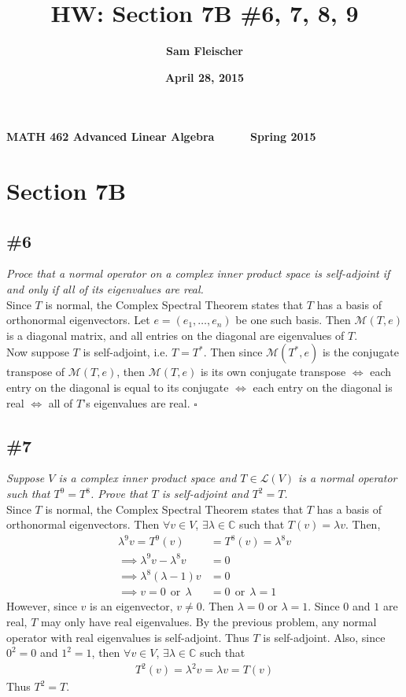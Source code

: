 \documentclass[12pt]{article}
\title{\bf HW: Section 7B \#6, 7, 8, 9}
\author{\bf Sam Fleischer}
\date{\bf April 28, 2015}
\begin{document}
{\bf MATH 462 \hfill Advanced Linear Algebra \ \ \ \ \ \hfill Spring 2015} 

{\let\newpage\relax\maketitle}

\section*{Section 7B}
\subsection*{\#6}
{\it Proce that a normal operator on a complex inner product space is self-adjoint if and only if all of its eigenvalues are real.} \\

\noindent Since $T$ is normal, the Complex Spectral Theorem states that $T$ has a basis of orthonormal eigenvectors.  Let $e = (e_1, \dots, e_n)$ be one such basis.  Then $\mathcal{M}(T, e)$ is a diagonal matrix, and all entries on the diagonal are eigenvalues of $T$. \\

\noindent Now suppose $T$ is self-adjoint, i.e. $T = T^*$.  Then since $\mathcal{M}(T^*, e)$ is the conjugate transpose of $\mathcal{M}(T, e)$, then $\mathcal{M}(T, e)$ is its own conjugate transpose $\iff$ each entry on the diagonal is equal to its conjugate $\iff$ each entry on the diagonal is real $\iff$ all of $T$'s eigenvalues are real. \hfill $\square$

\subsection*{\#7}
{\it Suppose $V$ is a complex inner product space and $T \in \mathcal{L}(V)$ is a normal operator such that $T^9 = T^8$.  Prove that $T$ is self-adjoint and $T^2 = T$.} \\

\noindent Since $T$ is normal, the Complex Spectral Theorem states that $T$ has a basis of orthonormal eigenvectors.  Then $\forall v \in V$, $\exists \lambda \in \mathbb{C}$ such that $T(v) = \lambda v$.  Then,
\begin{align*}
		\lambda^9v = T^9(v) &= T^8(v) = \lambda^8v \\
		\implies \lambda^9v - \lambda^8v &= 0 \\
		\implies \lambda^8(\lambda - 1)v &= 0 \\
		\implies v = 0\ \ \text{or}\ \ \lambda &= 0\ \ \text{or}\ \ \lambda = 1
\end{align*}
However, since $v$ is an eigenvector, $v \neq 0$.  Then $\lambda = 0$ or $\lambda = 1$.  Since $0$ and $1$ are real, $T$ may only have real eigenvalues.  By the previous problem, any normal operator with real eigenvalues is self-adjoint.  Thus $T$ is self-adjoint.  Also, since $0^2 = 0$ and $1^2 = 1$, then $\forall v \in V$, $\exists \lambda \in \mathbb{C}$ such that
\begin{align*}
		T^2(v) = \lambda^2v = \lambda v = T(v)
\end{align*}
Thus $T^2 = T$.
\end{document}
